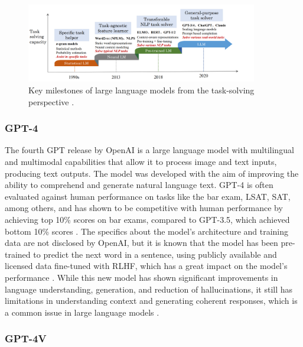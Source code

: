 \documentclass[english, 12pt, a4paper, elec, utf8, a-2b, online]{aaltothesis}
\begin{document}
\begin{figure}[H]
    \centering
    \includegraphics[width=0.9\textwidth]{images/llms_milestones.png}
    \caption{Key milestones of large language models from the task-solving perspective \cite{Zhao2023}.}
    \label{fig:llms_milestones}
\end{figure}

\subsubsection{GPT-4}

The fourth \ac{GPT} release by OpenAI is a large language model with multilingual and multimodal capabilities that allow it to process image and text inputs, producing text outputs.
The model was developed with the aim of improving the ability to comprehend and generate natural language text.
\ac{GPT}-4 is often evaluated against human performance on tasks like the bar exam, LSAT, SAT, among others, and has shown to be competitive with human performance by achieving top 10\% scores on bar exams, compared to \ac{GPT}-3.5, which achieved bottom 10\% scores \cite{OpenAI2023GPT4}.
The specifics about the model's architecture and training data are not disclosed by OpenAI, but it is known that the model has been pre-trained to predict the next word in a sentence, using publicly available and licensed data fine-tuned with \ac{RLHF}, which has a great impact on the model's performance \cite{OpenAI2023GPT4}.
While this new model has shown significant improvements in language understanding, generation, and reduction of hallucinations, it still has limitations in understanding context and generating coherent responses, which is a common issue in large language models \cite{OpenAI2023GPT4}.

\subsubsection{GPT-4V}
\end{document}
